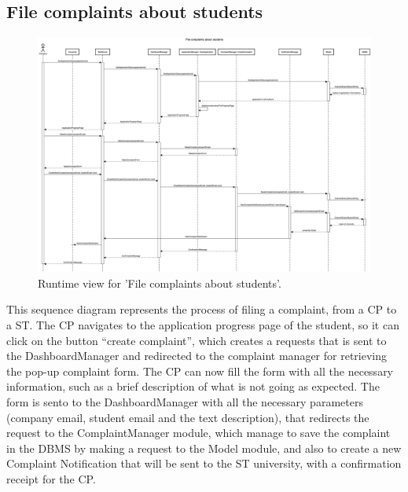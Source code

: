 \subsection{File complaints about students}
\begin{figure}[H]
    \begin{center}
        \includegraphics[width=0.8\linewidth]{DD/LaTeX/Images/RuntimeView/FileComplaintsAboutStudents.png}
        \caption{Runtime view for 'File complaints about students'.}
        \label{fig:runtime_FileComplaintsAboutStudents}%
    \end{center}
\end{figure}

This sequence diagram represents the process of filing a complaint, from a CP to a ST. The CP navigates to the application progress page of the student, so it can click on the button “create complaint”, which creates a requests that is sent to the DashboardManager and redirected to the complaint manager for retrieving the pop-up complaint form. The CP can now fill the form with all the necessary information, such as a brief description of what is not going as expected. The form is sento to the DashboardManager with all the necessary parameters (company email, student email and the text description), that redirects the request to the ComplaintManager module, which manage to save the complaint in the DBMS by making a request to the Model module, and also to create a new Complaint Notification that will be sent to the ST university, with a confirmation receipt for the CP.



